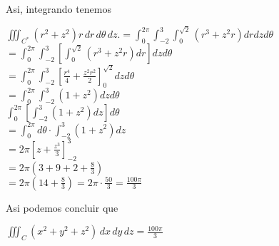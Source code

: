 Asi, integrando tenemos\begin{center}
    $\displaystyle\iiint_{C^*} (r^2 + z^2) r \, dr \, d\theta \, dz. = \displaystyle\int_{0}^{2\pi}\int_{-2}^{3}\int_{0}^{\sqrt{2}} (r^3+z^2r) dr dz d\theta$\\
    \vspace{0.7cm}
    $=\displaystyle\int_{0}^{2\pi}\int_{-2}^{3}\left [ \displaystyle\int_{0}^{\sqrt{2}} (r^3+z^2r) dr \right ] dzd\theta$\\
    \vspace{0.7cm}
    $=\displaystyle\int_{0}^{2\pi}\int_{-2}^{3} \left [ \displaystyle\frac{r^4}{4} + \frac{z^2r^2}{2} \right ]_{0}^{\sqrt{2}} dzd\theta$\\
    \vspace{0.7cm}
    $=\displaystyle\int_{0}^{2\pi}\int_{-2}^{3} (1+z^2)dzd\theta$\\
    \vspace{0.7cm}
    $\displaystyle\int_{0}^{2\pi} \left [ \displaystyle\int_{-2}^{3} (1+z^2) dz\right ] d\theta$\\
    \vspace{0.7cm}
    $=\displaystyle\int_{0}^{2\pi} d\theta \cdot \displaystyle\int_{-2}^{3} (1+z^2)dz$\\
    \vspace{0.7cm}
    $=\displaystyle2\pi\left [ z + \frac{z^3}{3} \right ]_{-2}^{3}$\\
    \vspace{0.7cm}
    $=\displaystyle 2\pi \left ( 3+9+2+\frac{8}{3} \right ) $\\
    \vspace{0.7cm}
    $=\displaystyle 2\pi\left ( 14 + \frac{8}{3} \right )  = 2\pi\cdot \frac{50}{3} = \frac{100\pi}{3}$
\end{center}Asi podemos concluir que\begin{center}
    $\displaystyle\iiint_C (x^2 + y^2 + z^2) \, dx \, dy \, dz = \frac{100\pi}{3}$
\end{center}
